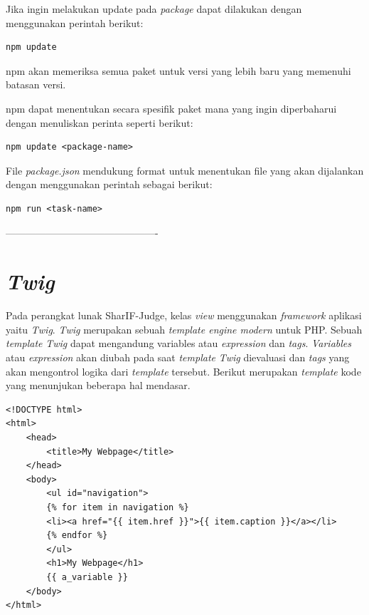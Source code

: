 Jika ingin melakukan update pada \textit{package} dapat dilakukan dengan menggunakan perintah berikut: 
     \begin{lstlisting}[basicstyle=\ttfamily, frame=single,
        columns=fullflexible, breaklines=true, numbers=none]
npm update
    \end{lstlisting} 
npm akan memeriksa semua paket untuk versi yang lebih baru yang memenuhi batasan versi.

npm dapat menentukan secara spesifik paket mana yang ingin diperbaharui dengan menuliskan perinta seperti berikut:
     \begin{lstlisting}[basicstyle=\ttfamily, frame=single,
        columns=fullflexible, breaklines=true, numbers=none]
npm update <package-name>
    \end{lstlisting} 

File \textit{package.json} mendukung format untuk menentukan file yang akan dijalankan dengan menggunakan perintah sebagai berikut: 
     \begin{lstlisting}[basicstyle=\ttfamily, frame=single,
        columns=fullflexible, breaklines=true, numbers=none]
npm run <task-name>
    \end{lstlisting} 
    


----------------------------------------------
\section{\textit{Twig}}
Pada perangkat lunak SharIF-Judge, kelas \textit{view} menggunakan \textit{framework} aplikasi yaitu \textit{Twig}. \textit{Twig} merupakan sebuah \textit{template engine modern} untuk PHP\cite{twig}. Sebuah \textit{template} \textit{Twig} dapat mengandung variables atau \textit{expression} dan \textit{tags}. \textit{Variables} atau \textit{expression} akan diubah pada saat \textit{template} \textit{Twig} dievaluasi dan \textit{tags} yang akan mengontrol logika dari \textit{template} tersebut. Berikut merupakan \textit{template} kode yang menunjukan beberapa hal mendasar.

 \begin{lstlisting}[basicstyle=\ttfamily, frame=single,
    columns=fullflexible, breaklines=true, numbers=none]
<!DOCTYPE html>
<html>
    <head>
        <title>My Webpage</title>
    </head>
    <body>
        <ul id="navigation">
        {% for item in navigation %}
        <li><a href="{{ item.href }}">{{ item.caption }}</a></li>
        {% endfor %}
        </ul>
        <h1>My Webpage</h1>
        {{ a_variable }}
    </body>
</html>
    \end{lstlisting}


